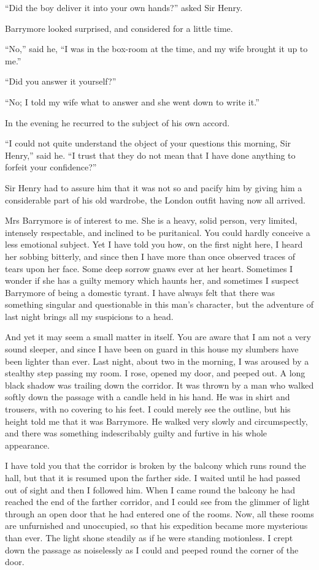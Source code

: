 \documentclass[paper=5.5in:8.5in,BCOR=7mm,twoside,DIV=calc,12pt,usegeometry,openany,chapterprefix,endperiod]{scrbook} %
\begin{document}
\enquote{Did the boy deliver it into your own hands?} asked Sir Henry.

Barrymore looked surprised, and considered for a little time.

\enquote{No,} said he, \enquote{I was in the box-room at the time, and my wife brought it up to me.}

\enquote{Did you answer it yourself?}

\enquote{No; I told my wife what to answer and she went down to write it.}

In the evening he recurred to the subject of his own accord.

\enquote{I could not quite understand the object of your questions this morning, Sir Henry,} said he. \enquote{I trust that they do not mean that I have done anything to forfeit your confidence?}

Sir Henry had to assure him that it was not so and pacify him by giving him a considerable part of his old wardrobe, the London outfit having now all arrived.

Mrs Barrymore is of interest to me. She is a heavy, solid person, very limited, intensely respectable, and inclined to be puritanical. You could hardly conceive a less emotional subject. Yet I have told you how, on the first night here, I heard her sobbing bitterly, and since then I have more than once observed traces of tears upon her face. Some deep sorrow gnaws ever at her heart. Sometimes I wonder if she has a guilty memory which haunts her, and sometimes I suspect Barrymore of being a domestic tyrant. I have always felt that there was something singular and questionable in this man's character, but the adventure of last night brings all my suspicions to a head.

And yet it may seem a small matter in itself. You are aware that I am not a very sound sleeper, and since I have been on guard in this house my slumbers have been lighter than ever. Last night, about two in the morning, I was aroused by a stealthy step passing my room. I rose, opened my door, and peeped out. A long black shadow was trailing down the corridor. It was thrown by a man who walked softly down the passage with a candle held in his hand. He was in shirt and trousers, with no covering to his feet. I could merely see the outline, but his height told me that it was Barrymore. He walked very slowly and circumspectly, and there was something indescribably guilty and furtive in his whole appearance.

I have told you that the corridor is broken by the balcony which runs round the hall, but that it is resumed upon the farther side. I waited until he had passed out of sight and then I followed him. When I came round the balcony he had reached the end of the farther corridor, and I could see from the glimmer of light through an open door that he had entered one of the rooms. Now, all these rooms are unfurnished and unoccupied, so that his expedition became more mysterious than ever. The light shone steadily as if he were standing motionless. I crept down the passage as noiselessly as I could and peeped round the corner of the door.
\end{document}
